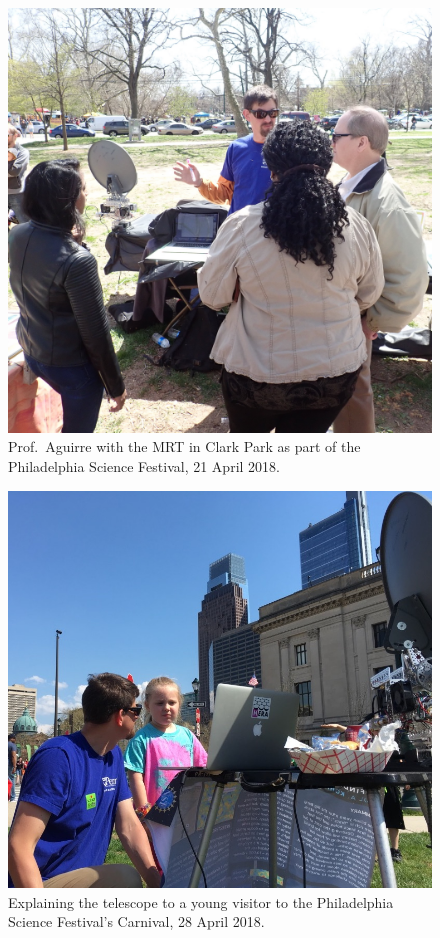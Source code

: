\documentclass[11pt,letterpaper]{spie}
\begin{document}
\begin{figure}[h]
\centering
\includegraphics[width=6.5in]{ClarkPark.jpg}
\vspace{5pt}
\caption{Prof.~Aguirre with the MRT in Clark Park as part of the Philadelphia Science Festival, 21 April 2018.}
\label{fig:ClarkPark}
\end{figure}

\begin{figure}[h]
\centering
\includegraphics[width=6.5in]{PSFCarnival2.jpg}
\vspace{5pt}
\caption{Explaining the telescope to a young visitor to the Philadelphia Science Festival's Carnival, 28 April 2018.}
\label{fig:Devices}
\end{figure}
\end{document}
